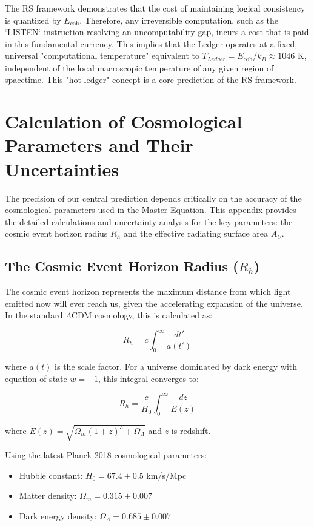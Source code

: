 \documentclass[11pt,a4paper]{article}
\theoremstyle{definition}
\theoremstyle{remark}
\begin{document}
The RS framework demonstrates that the cost of maintaining logical consistency is quantized by $E_{\text{coh}}$. Therefore, any irreversible computation, such as the `LISTEN` instruction resolving an uncomputability gap, incurs a cost that is paid in this fundamental currency. This implies that the Ledger operates at a fixed, universal "computational temperature" equivalent to $T_{Ledger} = E_{\text{coh}} / k_B \approx 1046$ K, independent of the local macroscopic temperature of any given region of spacetime. This "hot ledger" concept is a core prediction of the RS framework.

\section{Calculation of Cosmological Parameters and Their Uncertainties}

The precision of our central prediction depends critically on the accuracy of the cosmological parameters used in the Master Equation. This appendix provides the detailed calculations and uncertainty analysis for the key parameters: the cosmic event horizon radius \(R_h\) and the effective radiating surface area \(A_U\).

\subsection{The Cosmic Event Horizon Radius (\(R_h\))}

The cosmic event horizon represents the maximum distance from which light emitted now will ever reach us, given the accelerating expansion of the universe. In the standard \(\Lambda\)CDM cosmology, this is calculated as:

\begin{equation}
    R_h = c \int_0^{\infty} \frac{dt'}{a(t')}
\end{equation}

where \(a(t)\) is the scale factor. For a universe dominated by dark energy with equation of state \(w = -1\), this integral converges to:

\begin{equation}
    R_h = \frac{c}{H_0} \int_0^{\infty} \frac{dz}{E(z)}
\end{equation}

where \(E(z) = \sqrt{\Omega_m(1+z)^3 + \Omega_\Lambda}\) and \(z\) is redshift.

Using the latest Planck 2018 cosmological parameters:
\begin{itemize}
    \item Hubble constant: \(H_0 = 67.4 \pm 0.5\) km/s/Mpc
    \item Matter density: \(\Omega_m = 0.315 \pm 0.007\)
    \item Dark energy density: \(\Omega_\Lambda = 0.685 \pm 0.007\)
\end{itemize}
\end{document}
